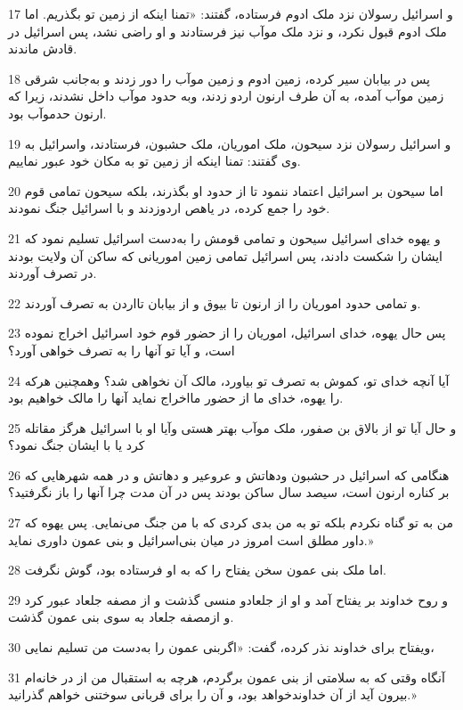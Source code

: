 \par 17 و اسرائیل رسولان نزد ملک ادوم فرستاده، گفتند: «تمنا اینکه از زمین تو بگذریم. اما ملک ادوم قبول نکرد، و نزد ملک موآب نیز فرستادند و او راضی نشد، پس اسرائیل در قادش ماندند.
\par 18 پس در بیابان سیر کرده، زمین ادوم و زمین موآب را دور زدند و به‌جانب شرقی زمین موآب آمده، به آن طرف ارنون اردو زدند، وبه حدود موآب داخل نشدند، زیرا که ارنون حدموآب بود.
\par 19 و اسرائیل رسولان نزد سیحون، ملک اموریان، ملک حشبون، فرستادند، واسرائیل به وی گفتند: تمنا اینکه از زمین تو به مکان خود عبور نماییم.
\par 20 اما سیحون بر اسرائیل اعتماد ننمود تا از حدود او بگذرند، بلکه سیحون تمامی قوم خود را جمع کرده، در یاهص اردوزدند و با اسرائیل جنگ نمودند.
\par 21 و یهوه خدای اسرائیل سیحون و تمامی قومش را به‌دست اسرائیل تسلیم نمود که ایشان را شکست دادند، پس اسرائیل تمامی زمین اموریانی که ساکن آن ولایت بودند در تصرف آوردند.
\par 22 و تمامی حدود اموریان را از ارنون تا بیوق و از بیابان تااردن به تصرف آوردند.
\par 23 پس حال یهوه، خدای اسرائیل، اموریان را از حضور قوم خود اسرائیل اخراج نموده است، و آیا تو آنها را به تصرف خواهی آورد؟
\par 24 آیا آنچه خدای تو، کموش به تصرف تو بیاورد، مالک آن نخواهی شد؟ وهمچنین هرکه را یهوه، خدای ما از حضور مااخراج نماید آنها را مالک خواهیم بود.
\par 25 و حال آیا تو از بالاق بن صفور، ملک موآب بهتر هستی وآیا او با اسرائیل هرگز مقاتله کرد یا با ایشان جنگ نمود؟
\par 26 هنگامی که اسرائیل در حشبون ودهاتش و عروعیر و دهاتش و در همه شهرهایی که بر کناره ارنون است، سیصد سال ساکن بودند پس در آن مدت چرا آنها را باز نگرفتید؟
\par 27 من به تو گناه نکردم بلکه تو به من بدی کردی که با من جنگ می‌نمایی. پس یهوه که داور مطلق است امروز در میان بنی‌اسرائیل و بنی عمون داوری نماید.»
\par 28 اما ملک بنی عمون سخن یفتاح را که به او فرستاده بود، گوش نگرفت.
\par 29 و روح خداوند بر یفتاح آمد و او از جلعادو منسی گذشت و از مصفه جلعاد عبور کرد و ازمصفه جلعاد به سوی بنی عمون گذشت.
\par 30 ویفتاح برای خداوند نذر کرده، گفت: «اگربنی عمون را به‌دست من تسلیم نمایی،
\par 31 آنگاه وقتی که به سلامتی از بنی عمون برگردم، هر‌چه به استقبال من از در خانه‌ام بیرون آید از آن خداوندخواهد بود، و آن را برای قربانی سوختنی خواهم گذرانید.»
